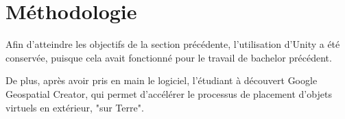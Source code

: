 
\section{Méthodologie}

Afin d'atteindre les objectifs de la section précédente, l'utilisation d'Unity a été conservée, puisque cela avait fonctionné pour le travail de bachelor précédent.

De plus, après avoir pris en main le logiciel, l'étudiant à découvert Google Geospatial Creator, qui permet d'accélérer le processus de placement d'objets virtuels
en extérieur, "sur Terre".



